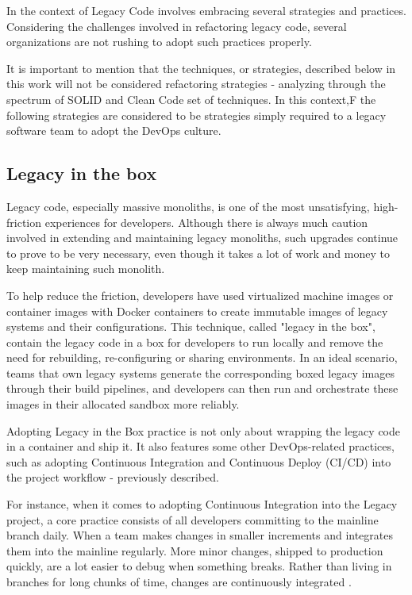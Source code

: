 In the context of Legacy Code involves embracing several strategies and
practices. Considering the challenges involved in refactoring legacy code,
several organizations are not rushing to adopt such practices properly.

It is important to mention that the techniques, or strategies, described below
in this work will not be considered refactoring strategies - analyzing through
the spectrum of SOLID and Clean Code set of techniques. In this context,F the
following strategies are considered to be strategies simply required to a legacy
software team to adopt the DevOps culture.

\subsection{Legacy in the box}

Legacy code, especially massive monoliths, is one of the most unsatisfying,
high-friction experiences for developers. Although there is always much caution
involved in extending and maintaining legacy monoliths, such upgrades continue
to prove to be very necessary, even though it takes a lot of work and money to
keep maintaining such monolith.

To help reduce the friction, developers have used virtualized machine images or
container images with Docker containers to create immutable images of legacy
systems and their configurations. This technique, called "legacy in the box",
contain the legacy code in a box for developers to run locally and remove the
need for rebuilding, re-configuring or sharing environments. In an ideal
scenario, teams that own legacy systems generate the corresponding boxed legacy
images through their build pipelines, and developers can then run and
orchestrate these images in their allocated sandbox more reliably.

Adopting Legacy in the Box practice is not only about wrapping the legacy code
in a container and ship it. It also features some other DevOps-related
practices, such as adopting Continuous Integration and Continuous Deploy (CI/CD)
into the project workflow - previously described.

For instance, when it comes to adopting Continuous Integration into the Legacy
project, a core practice consists of all developers committing to the mainline
branch daily. When a team makes changes in smaller increments and integrates
them into the mainline regularly. More minor changes, shipped to production
quickly, are a lot easier to debug when something breaks. Rather than living in
branches for long chunks of time, changes are continuously integrated
\cite{meyer2014}.

